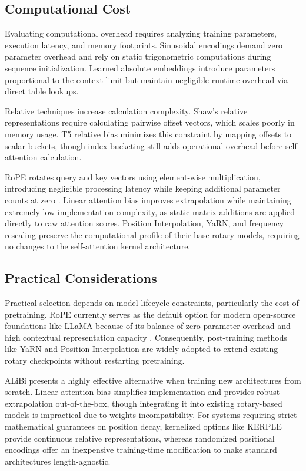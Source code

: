\documentclass[conference]{IEEEtran}
\begin{document}
\subsection{Computational Cost}

Evaluating computational overhead requires analyzing training parameters, execution latency, and memory footprints. Sinusoidal encodings demand zero parameter overhead and rely on static trigonometric computations during sequence initialization. Learned absolute embeddings introduce parameters proportional to the context limit but maintain negligible runtime overhead via direct table lookups.

Relative techniques increase calculation complexity. Shaw's relative representations require calculating pairwise offset vectors, which scales poorly in memory usage. T5 relative bias minimizes this constraint by mapping offsets to scalar buckets, though index bucketing still adds operational overhead before self-attention calculation.

RoPE rotates query and key vectors using element-wise multiplication, introducing negligible processing latency while keeping additional parameter counts at zero \cite{su2024roformer}. Linear attention bias improves extrapolation while maintaining extremely low implementation complexity, as static matrix additions are applied directly to raw attention scores. Position Interpolation, YaRN, and frequency rescaling preserve the computational profile of their base rotary models, requiring no changes to the self-attention kernel architecture.

\subsection{Practical Considerations}

Practical selection depends on model lifecycle constraints, particularly the cost of pretraining. RoPE currently serves as the default option for modern open-source foundations like LLaMA because of its balance of zero parameter overhead and high contextual representation capacity \cite{touvron2023}. Consequently, post-training methods like YaRN and Position Interpolation are widely adopted to extend existing rotary checkpoints without restarting pretraining.

ALiBi presents a highly effective alternative when training new architectures from scratch. Linear attention bias simplifies implementation and provides robust extrapolation out-of-the-box, though integrating it into existing rotary-based models is impractical due to weights incompatibility. For systems requiring strict mathematical guarantees on position decay, kernelized options like KERPLE provide continuous relative representations, whereas randomized positional encodings offer an inexpensive training-time modification to make standard architectures length-agnostic.
\end{document}
